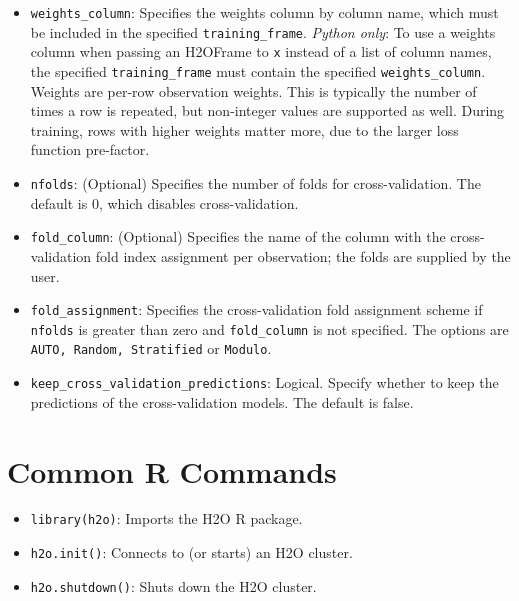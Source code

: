 {{\begin{itemize}
\item \texttt{weights\_column}: Specifies the weights column by column name, which must be included in the specified \texttt{training\_frame}. \textit{Python only}: To use a weights column when passing an H2OFrame to \texttt{x} instead of a list of column names, the specified \texttt{training\_frame} must contain the specified \texttt{weights\_column}. Weights are per-row observation weights. This is typically the number of times a row is repeated, but non-integer values are supported as well. During training, rows with higher weights matter more, due to the larger loss function pre-factor.

\item \texttt{nfolds}: (Optional) Specifies the number of folds for cross-validation. %
The default is 0, which disables cross-validation.

\item \texttt{fold\_column}: (Optional) Specifies the name of the column with the cross-validation fold index assignment per observation; the folds are supplied by the user. 

\item \texttt{fold\_assignment}: Specifies the cross-validation fold assignment scheme if \texttt{nfolds} is greater than zero and \texttt{fold\_column} is not specified. The options are \texttt{AUTO, Random, Stratified} or \texttt{Modulo}. 

\item \texttt{keep\_cross\_validation\_predictions}: Logical.  Specify whether to keep the predictions of the cross-validation models.  The default is false.

\end{itemize}

\section{Common R Commands}
\begin{itemize}

\item \texttt{library(h2o)}: Imports the H2O R package.

\item \texttt{h2o.init()}:  Connects to (or starts) an H2O cluster.

\item \texttt{h2o.shutdown()}: Shuts down the H2O cluster.


\end{itemize}}}
